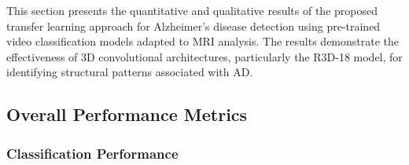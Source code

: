 \documentclass[12pt, a4paper]{article}
\begin{document}













This section presents the quantitative and qualitative results of the proposed transfer learning approach for Alzheimer's disease detection using pre-trained video classification models adapted to MRI analysis. The results demonstrate the effectiveness of 3D convolutional architectures, particularly the R3D-18 model, for identifying structural patterns associated with AD.

\subsection{Overall Performance Metrics}

\subsubsection{Classification Performance}
\end{document}
